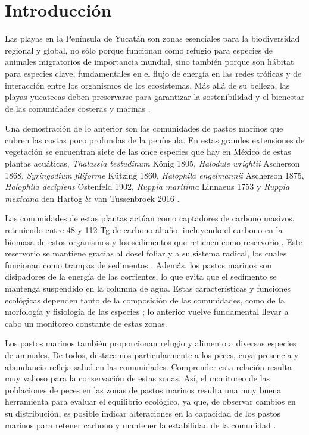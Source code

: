 \documentclass[
  authoryear,
  preprint,
  3p,
  twocolumn]{elsarticle}
\begin{document}
\section{Introducción}\label{introducciuxf3n}

Las playas en la Península de Yucatán son zonas esenciales para la
biodiversidad regional y global, no sólo porque funcionan como refugio
para especies de animales migratorios de importancia mundial, sino
también porque son hábitat para especies clave, fundamentales en el
flujo de energía en las redes tróficas y de interacción entre los
organismos de los ecosistemas. Más allá de su belleza, las playas
yucatecas deben preservarse para garantizar la sostenibilidad y el
bienestar de las comunidades costeras y marinas
\citep{AguilarMedrano2007}.

Una demostración de lo anterior son las comunidades de pastos marinos
que cubren las costas poco profundas de la península. En estas grandes
extensiones de vegetación se encuentran siete de las once especies que
hay en México de estas plantas acuáticas, \emph{Thalassia testudinum}
König 1805, \emph{Halodule wrightii} Ascherson 1868, \emph{Syringodium
filiforme} Kützing 1860, \emph{Halophila engelmannii} Ascherson 1875,
\emph{Halophila decipiens} Ostenfeld 1902, \emph{Ruppia maritima}
Linnaeus 1753 y \emph{Ruppia mexicana} den Hartog \& van Tussenbroek
2016 \citep{EspinozaAvalos1996, DENHARTOG201638}.

Las comunidades de estas plantas actúan como captadores de carbono
masivos, reteniendo entre 48 y 112 Tg de carbono al año, incluyendo el
carbono en la biomasa de estos organismos y los sedimentos que retienen
como reservorio \citep{Kennedy2010, OCANA2023102979}. Este reservorio se
mantiene gracias al dosel foliar y a su sistema radical, los cuales
funcionan como trampas de sedimentos \citep{Fourqurean2012}. Además, los
pastos marinos son disipadores de la energía de las corrientes, lo que
evita que el sedimento se mantenga suspendido en la columna de agua.
Estas características y funciones ecológicas dependen tanto de la
composición de las comunidades, como de la morfología y fisiología de
las especies \citep{GarciaDuarte2001}; lo anterior vuelve fundamental
llevar a cabo un monitoreo constante de estas zonas.

Los pastos marinos también proporcionan refugio y alimento a diversas
especies de animales. De todos, destacamos particularmente a los peces,
cuya presencia y abundancia refleja salud en las comunidades. Comprender
esta relación resulta muy valioso para la conservación de estas zonas.
Así, el monitoreo de las poblaciones de peces en las zonas de pastos
marinos resulta una muy buena herramienta para evaluar el equilibrio
ecológico, ya que, de observar cambios en su distribución, es posible
indicar alteraciones en la capacidad de los pastos marinos para retener
carbono y mantener la estabilidad de la comunidad
\citep{AguilarMedrano2007, CHOVANEC2003639}.
\end{document}
